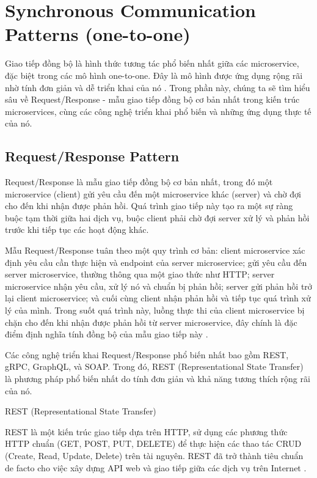 \section{Synchronous Communication Patterns (one-to-one)}
Giao tiếp đồng bộ là hình thức tương tác phổ biến nhất giữa các microservice, đặc biệt trong các mô hình one-to-one. Đây là mô hình được ứng dụng rộng rãi nhờ tính đơn giản và dễ triển khai của nó \cite{newman2015}. Trong phần này, chúng ta sẽ tìm hiểu sâu về Request/Response - mẫu giao tiếp đồng bộ cơ bản nhất trong kiến trúc microservices, cùng các công nghệ triển khai phổ biến và những ứng dụng thực tế của nó.

\subsection{Request/Response Pattern}
Request/Response là mẫu giao tiếp đồng bộ cơ bản nhất, trong đó một microservice (client) gửi yêu cầu đến một microservice khác (server) và chờ đợi cho đến khi nhận được phản hồi. Quá trình giao tiếp này tạo ra một sự ràng buộc tạm thời giữa hai dịch vụ, buộc client phải chờ đợi server xử lý và phản hồi trước khi tiếp tục các hoạt động khác.

Mẫu Request/Response tuân theo một quy trình cơ bản: client microservice xác định yêu cầu cần thực hiện và endpoint của server microservice; gửi yêu cầu đến server microservice, thường thông qua một giao thức như HTTP; server microservice nhận yêu cầu, xử lý nó và chuẩn bị phản hồi; server gửi phản hồi trở lại client microservice; và cuối cùng client nhận phản hồi và tiếp tục quá trình xử lý của mình. Trong suốt quá trình này, luồng thực thi của client microservice bị chặn cho đến khi nhận được phản hồi từ server microservice, đây chính là đặc điểm định nghĩa tính đồng bộ của mẫu giao tiếp này \cite{newman2015}.

Các công nghệ triển khai Request/Response phổ biến nhất bao gồm REST, gRPC, GraphQL, và SOAP. Trong đó, REST (Representational State Transfer) là phương pháp phổ biến nhất do tính đơn giản và khả năng tương thích rộng rãi của nó.

REST (Representational State Transfer)

REST là một kiến trúc giao tiếp dựa trên HTTP, sử dụng các phương thức HTTP chuẩn (GET, POST, PUT, DELETE) để thực hiện các thao tác CRUD (Create, Read, Update, Delete) trên tài nguyên. REST đã trở thành tiêu chuẩn de facto cho việc xây dựng API web và giao tiếp giữa các dịch vụ trên Internet \cite{fielding2000}.

